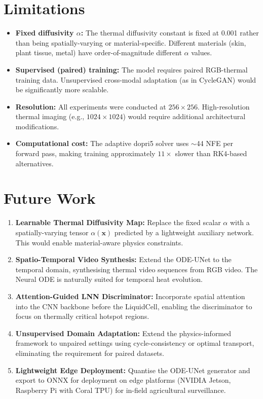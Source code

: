 \section{Limitations}

\begin{itemize}
    \item \textbf{Fixed diffusivity $\alpha$:} The thermal diffusivity constant is fixed at 0.001 rather than being spatially-varying or material-specific. Different materials (skin, plant tissue, metal) have order-of-magnitude different $\alpha$ values.
    \item \textbf{Supervised (paired) training:} The model requires paired RGB-thermal training data. Unsupervised cross-modal adaptation (as in CycleGAN) would be significantly more scalable.
    \item \textbf{Resolution:} All experiments were conducted at $256 \times 256$. High-resolution thermal imaging (e.g., $1024 \times 1024$) would require additional architectural modifications.
    \item \textbf{Computational cost:} The adaptive dopri5 solver uses $\sim$44 NFE per forward pass, making training approximately $11\times$ slower than RK4-based alternatives.
\end{itemize}

\section{Future Work}

\begin{enumerate}
    \item \textbf{Learnable Thermal Diffusivity Map:} Replace the fixed scalar $\alpha$ with a spatially-varying tensor $\alpha(\mathbf{x})$ predicted by a lightweight auxiliary network. This would enable material-aware physics constraints.
    \item \textbf{Spatio-Temporal Video Synthesis:} Extend the ODE-UNet to the temporal domain, synthesising thermal video sequences from RGB video. The Neural ODE is naturally suited for temporal heat evolution.
    \item \textbf{Attention-Guided LNN Discriminator:} Incorporate spatial attention into the CNN backbone before the LiquidCell, enabling the discriminator to focus on thermally critical hotspot regions.
    \item \textbf{Unsupervised Domain Adaptation:} Extend the physics-informed framework to unpaired settings using cycle-consistency or optimal transport, eliminating the requirement for paired datasets.
    \item \textbf{Lightweight Edge Deployment:} Quantise the ODE-UNet generator and export to ONNX for deployment on edge platforms (NVIDIA Jetson, Raspberry Pi with Coral TPU) for in-field agricultural surveillance.
\end{enumerate}

